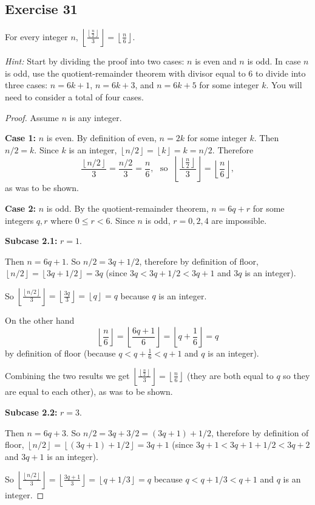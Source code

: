 \documentclass[14pt]{extarticle}
\newcommand{\dps}{\displaystyle}
\newcommand{\floor}[1]{{\left\lfloor#1\right\rfloor}}
\begin{document}
\subsection{Exercise 31}
For every integer $n$, $\dps \floor{\frac{\floor{\frac{n}{2}}}{3}} = \floor{\frac{n}{6}}$.

{\it Hint:} Start by dividing the proof into two cases: $n$ is even and $n$ is odd. In case $n$ is odd, use the quotient-remainder theorem with divisor equal to 6 to divide into three cases: $n = 6k + 1$, $n = 6k + 3$, and $n = 6k + 5$ for some integer $k$. You will need to consider a total of four cases.

\begin{proof}
Assume $n$ is any integer.

{\bf Case 1:} $n$ is even. By definition of even, $n = 2k$ for some integer $k$. Then $n/2 = k$. Since $k$ is an integer, $\floor{n/2} = \floor{k} = k = n/2$. Therefore 
\[
\frac{\floor{n/2}}{3} = \frac{n/2}{3} = \frac{n}{6}, \,\, \text{ so } \,\, \floor{\frac{\floor{\frac{n}{2}}}{3}} = \floor{\frac{n}{6}},
\]
as was to be shown.

{\bf Case 2:} $n$ is odd. By the quotient-remainder theorem, $n = 6q+r$ for some integers $q,r$ where $0 \leq r < 6$. Since $n$ is odd, $r = 0, 2, 4$ are impossible.

{\bf Subcase 2.1:} $r = 1$. 

Then $n = 6q+1$. So $n/2 = 3q+1/2$, therefore by definition of floor, $\floor{n/2} = \floor{3q+1/2} = 3q$ (since $3q < 3q+1/2< 3q+1$ and $3q$ is an integer). 

So $\floor{\frac{\floor{n/2}}{3}} = \floor{\frac{3q}{3}} = \floor{q} = q$ because $q$ is an integer.

On the other hand 
\[
\floor{\frac{n}{6}} = \floor{\frac{6q+1}{6}} = \floor{q+\frac{1}{6}} = q
\]
by definition of floor (because $q < q+\frac{1}{6} < q+1$ and $q$ is an integer).

Combining the two results we get $ \floor{\frac{\floor{\frac{n}{2}}}{3}} = \floor{\frac{n}{6}}$ (they are both equal to $q$ so they are equal to each other), as was to be shown.

{\bf Subcase 2.2:} $r = 3$. 

Then $n = 6q+3$. So $n/2 = 3q+3/2 = (3q+1)+1/2$, therefore by definition of floor, $\floor{n/2} = \floor{(3q+1)+1/2} = 3q+1$ (since $3q+1 < 3q+1+1/2< 3q+2$ and $3q+1$ is an integer). 

So $\floor{\frac{\floor{n/2}}{3}} = \floor{\frac{3q+1}{3}} = \floor{q+1/3} = q$ because $q < q+1/3 < q+1$ and $q$ is an integer.


\end{proof}
\end{document}
